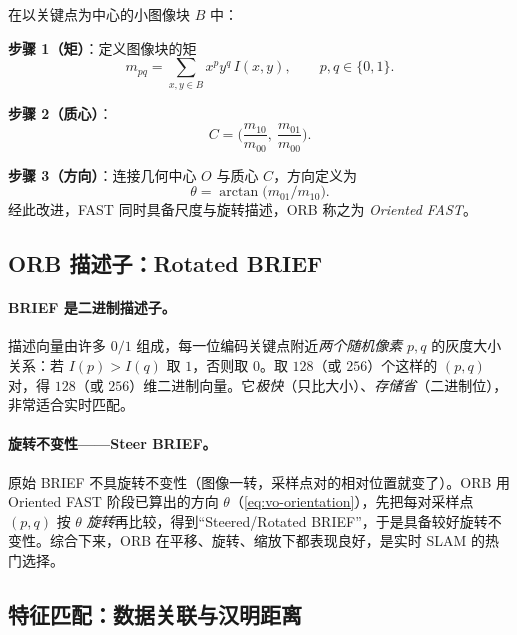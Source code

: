 \begin{derivation}[灰度质心法求特征点方向]
\label{def:vo-centroid}
在以关键点为中心的小图像块 $B$ 中：

\textbf{步骤 1（矩）}：定义图像块的矩
\begin{equation}
  m_{pq}=\sum_{x,y\in B} x^{p}y^{q}\, I(x,y),\qquad p,q\in\{0,1\}.
  \label{eq:vo-moment}
\end{equation}

\textbf{步骤 2（质心）}：
\begin{equation}
  C=\Big(\frac{m_{10}}{m_{00}},\ \frac{m_{01}}{m_{00}}\Big).
  \label{eq:vo-centroid}
\end{equation}

\textbf{步骤 3（方向）}：连接几何中心 $O$ 与质心 $C$，方向定义为
\begin{equation}
  \theta=\arctan\!\big(m_{01}/m_{10}\big).
  \label{eq:vo-orientation}
\end{equation}
经此改进，FAST 同时具备尺度与旋转描述，ORB 称之为 \emph{Oriented FAST}。
\end{derivation}

\subsection{ORB 描述子：Rotated BRIEF}
\label{sec:vo-brief}

\paragraph{BRIEF 是二进制描述子\cite{gaoxiang2019slam14,carlone2026handbook}。}描述向量由许多 $0/1$ 组成，每一位编码关键点附近\emph{两个随机像素} $p,q$ 的灰度大小关系：若 $I(p)>I(q)$ 取 $1$，否则取 $0$。取 $128$（或 $256$）个这样的 $(p,q)$ 对，得 $128$（或 $256$）维二进制向量。它\emph{极快}（只比大小）、\emph{存储省}（二进制位），非常适合实时匹配。

\paragraph{旋转不变性——Steer BRIEF\cite{gaoxiang2019slam14}。}原始 BRIEF 不具旋转不变性（图像一转，采样点对的相对位置就变了）。ORB 用 Oriented FAST 阶段已算出的方向 $\theta$（\cref{eq:vo-orientation}），先把每对采样点 $(p,q)$ 按 $\theta$ \emph{旋转}再比较，得到“Steered/Rotated BRIEF”，于是具备较好旋转不变性。综合下来，ORB 在平移、旋转、缩放下都表现良好，是实时 SLAM 的热门选择。

\subsection{特征匹配：数据关联与汉明距离}
\label{sec:vo-match}

